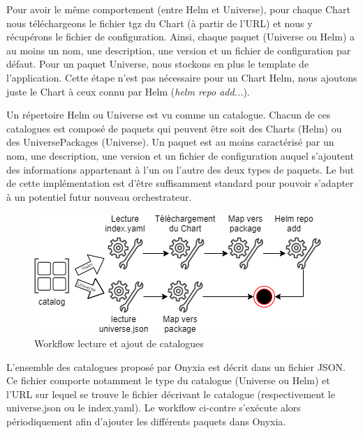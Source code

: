 \documentclass[11pt,fleqn]{book} %
\begin{document}
\vspace{-0.5cm}
Pour avoir le même comportement (entre Helm et Universe), pour chaque Chart nous téléchargeons le fichier tgz du Chart (à partir de l'URL) et nous y récupérons le fichier de configuration. Ainsi, chaque paquet (Universe ou Helm) a au moins un nom, une description, une version et un fichier de configuration par défaut. Pour un paquet Universe, nous stockons en plus le template de l'application. Cette étape n'est pas nécessaire pour un Chart Helm, nous ajoutons juste le Chart à ceux connu par Helm (\textit{helm repo add...}).
\vspace{-0.5cm}
\begin{interrupt}
Un répertoire Helm ou Universe est vu comme un catalogue. Chacun de ces catalogues est composé de paquets qui peuvent être soit des Charts (Helm) ou des UniversePackages (Universe). Un paquet est au moins caractérisé par un nom, une description, une version et un fichier de configuration auquel s'ajoutent des informations appartenant à l'un ou l'autre des deux types de paquets. Le but de cette implémentation est d'être suffisamment standard pour pouvoir s'adapter à un potentiel futur nouveau orchestrateur.
\end{interrupt}

\begin{figure}
\renewcommand{\figurename}{Diagramme}
\includegraphics[scale=0.6]{Pictures/onyxia/workflow-catalog.png}
\caption{Workflow lecture et ajout de catalogues \newline}
\end{figure}
\vspace{-0.5cm}
L'ensemble des catalogues proposé par Onyxia est décrit dans un fichier JSON. Ce fichier comporte notamment le type du catalogue (Universe ou Helm) et l'URL sur lequel se trouve le fichier décrivant le catalogue (respectivement le universe.json ou le index.yaml). Le workflow ci-contre s'exécute alors périodiquement afin d'ajouter les différents paquets dans Onyxia.
\end{document}
